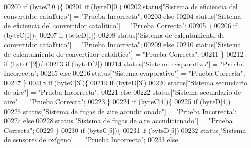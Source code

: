 \begin{DoxyCode}
00200         \textcolor{keywordflow}{if} (byteC[0])\{
00201             \textcolor{keywordflow}{if} (byteD[0])
00202                 status[\textcolor{stringliteral}{"Sistema de eficiencia del convertidor catalítico"}] = \textcolor{stringliteral}{"Prueba Incorrecta"};
00203             \textcolor{keywordflow}{else}
00204                 status[\textcolor{stringliteral}{"Sistema de eficiencia del convertidor catalítico"}] = \textcolor{stringliteral}{"Prueba Correcta"};
00205         \}
00206         \textcolor{keywordflow}{if} (byteC[1])\{
00207             \textcolor{keywordflow}{if} (byteD[1])
00208                 status[\textcolor{stringliteral}{"Sistema de calentamiento de convertidor catalítico"}] = \textcolor{stringliteral}{"Prueba Incorrecta"};
00209             \textcolor{keywordflow}{else}
00210                 status[\textcolor{stringliteral}{"Sistema de calentamiento de convertidor catalítico"}] = \textcolor{stringliteral}{"Prueba Correcta"};
00211         \}
00212         \textcolor{keywordflow}{if} (byteC[2])\{
00213             \textcolor{keywordflow}{if} (byteD[2])
00214                 status[\textcolor{stringliteral}{"Sistema evaporativo"}] = \textcolor{stringliteral}{"Prueba Incorrecta"};
00215             \textcolor{keywordflow}{else}
00216                 status[\textcolor{stringliteral}{"Sistema evaporativo"}] = \textcolor{stringliteral}{"Prueba Correcta"};
00217         \}
00218         \textcolor{keywordflow}{if} (byteC[3])\{
00219             \textcolor{keywordflow}{if} (byteD[3])
00220                 status[\textcolor{stringliteral}{"Sistema secundario de aire"}] = \textcolor{stringliteral}{"Prueba Incorrecta"};
00221             \textcolor{keywordflow}{else}
00222                 status[\textcolor{stringliteral}{"Sistema secundario de aire"}] = \textcolor{stringliteral}{"Prueba Correcta"};
00223         \}
00224         \textcolor{keywordflow}{if} (byteC[4])\{
00225             \textcolor{keywordflow}{if} (byteD[4])
00226                 status[\textcolor{stringliteral}{"Sistema de fugas de aire acondicionado"}] = \textcolor{stringliteral}{"Prueba Incorrecta"};
00227             \textcolor{keywordflow}{else}
00228                 status[\textcolor{stringliteral}{"Sistema de fugas de aire acondicionado"}] = \textcolor{stringliteral}{"Prueba Correcta"};
00229         \}
00230         \textcolor{keywordflow}{if} (byteC[5])\{
00231             \textcolor{keywordflow}{if} (byteD[5])
00232                 status[\textcolor{stringliteral}{"Sistema de sensores de oxígeno"}] = \textcolor{stringliteral}{"Prueba Incorrecta"};
00233             \textcolor{keywordflow}{else}

\end{DoxyCode}
